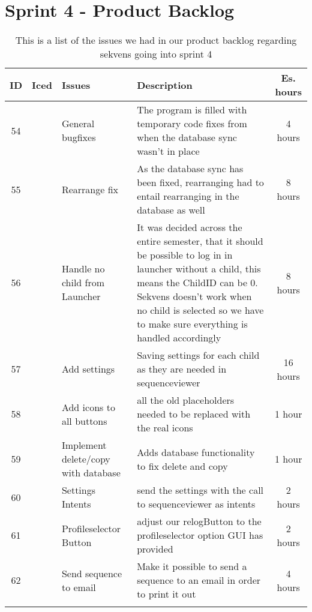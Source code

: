 \section{Sprint 4 - Product Backlog}
\begin{longtable} { | c | c | p{5cm} | p{5cm} | c | } 
\hline
	ID 	&	Iced	&	Issues	&	Description		&	 Es. hours \\\hline
	54	& 	 	&	General bugfixes		& 	The program is filled with temporary code fixes from when the database sync wasn't in place	 & 4 hours  \\\hline
	55	& 	 	&	Rearrange fix	& 	As the database sync has been fixed, rearranging had to entail rearranging in the database as well	 &   8 hours \\\hline
	56	& 	 	&	Handle no child from Launcher	& 	It was decided across the entire semester, that it should be possible to log in in launcher without a child, this means the ChildID can be 0. Sekvens doesn't work when no child is selected so we have to make sure everything is handled accordingly	 &  8 hours \\\hline
	57	& 	 	&	Add settings	& 	Saving settings for each child as they are needed in sequenceviewer	& 	16 hours  \\\hline
	58	& 	 	&	Add icons to all buttons	& 	all the old placeholders needed to be replaced with the real icons	 & 	1 hour  \\\hline
	59	& 	 	&	Implement delete/copy with database	& 	Adds database functionality to fix delete and copy	 & 1 hour  \\\hline
	60	& 	 	&	Settings Intents		& 	send the settings with the call to sequenceviewer as intents	 &  2 hours \\\hline
	61	& 	 	&	Profileselector Button	& 	adjust our relogButton to the profileselector option GUI has provided	 &   2 hours 	 \\\hline
	62	& 	 	&	Send sequence to email	& 	Make it possible to send a sequence to an email in order to print it out &  4 hours \\\hline
\caption{This is a list of the issues we had in our product backlog regarding sekvens going into sprint 4}
\label{tab:spr4_prodblog}
\end{longtable}

